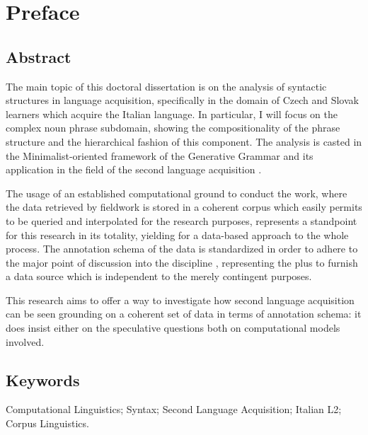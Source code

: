 \documentclass[a4paper,twoside,12pt,chapterprefix=false,bibliography=totocnumbered,listof=flat]{scrbook}
\theoremstyle{definition}
\theoremstyle{definition}
\theoremstyle{definition}
\theoremstyle{remark}
\begin{document}
{
\setcounter{tocdepth}{1}
\tableofcontents
}
\listoftables
\listoffigures
\chapter*{Preface}\label{preface}

\section*{Abstract}\label{abstract}

The main topic of this doctoral dissertation is on the analysis of
syntactic structures in language acquisition, specifically in the domain
of Czech and Slovak learners which acquire the Italian language. In
particular, I will focus on the complex noun phrase subdomain, showing
the compositionality of the phrase structure and the hierarchical
fashion of this component. The analysis is casted in the
Minimalist-oriented framework of the Generative Grammar
\citep{chomsky1995, chomsky1998, chomsky2013, hcf2002} and its
application in the field of the second language acquisition
\citep{rothmanslabakova2017, slabakovalealliskin2014}.

The usage of an established computational ground to conduct the work,
where the data retrieved by fieldwork is stored in a coherent corpus
which easily permits to be queried and interpolated for the research
purposes, represents a standpoint for this research in its totality,
yielding for a data-based approach to the whole process. The annotation
schema of the data is standardized in order to adhere to the major point
of discussion into the discipline
\citep{clark2010, kueblerzinsmeinster2015, kurdi2016}, representing the
plus to furnish a data source which is independent to the merely
contingent purposes.

This research aims to offer a way to investigate how second language
acquisition can be seen grounding on a coherent set of data in terms of
annotation schema: it does insist either on the speculative questions
both on computational models involved.

\section*{Keywords}\label{keywords}

Computational Linguistics; Syntax; Second Language Acquisition; Italian
L2; Corpus Linguistics.
\end{document}

